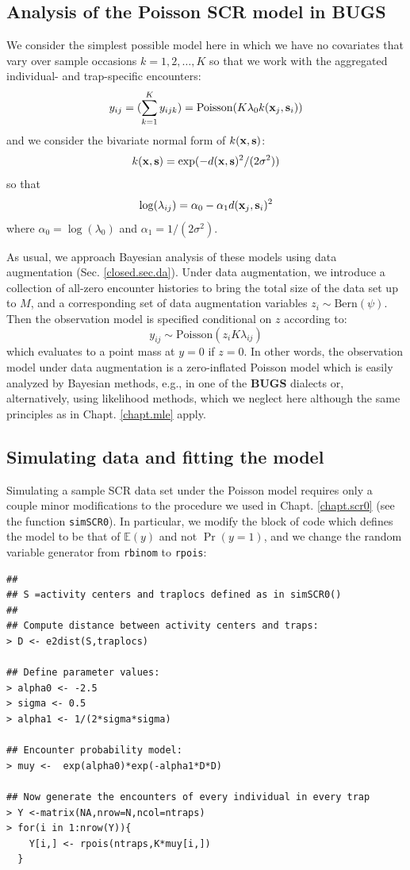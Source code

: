 \subsection{Analysis of the Poisson SCR model in BUGS}

We consider the simplest possible model here in which we have no
covariates that vary over sample occasions $k=1,2,\ldots,K$ so that we
work with the aggregated individual- and trap-specific encounters:
\[
y_{ij} = (\sum_{k=1}^{K} y_{ijk}) =  \mbox{Poisson}(K  \lambda_{0}
k({\bf x}_{j},{\bf s}_{i}) )
\]
and we consider the bivariate normal form of $k({\bf x},{\bf s})$:
\[
k({\bf x},{\bf s}) = \exp( -d({\bf x}, {\bf
  s})^{2} /(2\sigma^{2}))
\]
so that
\[
\log( \lambda_{ij})  =\alpha_{0} - \alpha_{1} d({\bf x}_{j}, {\bf s}_{i})^2
\]
where $\alpha_{0} = \log(\lambda_{0})$ and $\alpha_1 = 1/(2\sigma^2)$.

As usual, we approach Bayesian analysis of these models using data
augmentation (Sec. \ref{closed.sec.da}).  Under data augmentation, we
introduce a collection of all-zero encounter histories to bring the
total size of the data set up to $M$, and a corresponding set of data
augmentation variables $z_{i} \sim \mbox{Bern}(\psi)$. Then the
observation model is specified conditional on $z$ according to:
\[
y_{ij} \sim  \mbox{Poisson}(z_{i} K  \lambda_{ij})
\]
which evaluates to a point mass at $y=0$ if $z=0$.  In other words,
the observation model under data augmentation is a zero-inflated
Poisson model which is easily analyzed by Bayesian methods, e.g., in
one of the {\bf BUGS} dialects or, alternatively, using likelihood
methods, which we neglect here although the same principles as in
Chapt. \ref{chapt.mle} apply.


\subsection{Simulating data and fitting the model}


Simulating a sample SCR data set under the Poisson model requires only
a couple minor modifications to the procedure we used in
Chapt. \ref{chapt.scr0} (see the function \mbox{\tt simSCR0}). In
particular, we modify the block of code which defines the model to be
that of $\mathbb{E}(y)$ and not $\Pr(y=1)$, and we change the random
variable generator from \mbox{\tt rbinom} to \mbox{\tt rpois}:
{\small
\begin{verbatim}
##
## S =activity centers and traplocs defined as in simSCR0()
##
## Compute distance between activity centers and traps:
> D <- e2dist(S,traplocs) 

## Define parameter values:
> alpha0 <- -2.5
> sigma <- 0.5
> alpha1 <- 1/(2*sigma*sigma)

## Encounter probability model:
> muy <-  exp(alpha0)*exp(-alpha1*D*D)

## Now generate the encounters of every individual in every trap
> Y <-matrix(NA,nrow=N,ncol=ntraps)
> for(i in 1:nrow(Y)){
    Y[i,] <- rpois(ntraps,K*muy[i,])
  }
\end{verbatim}
}


